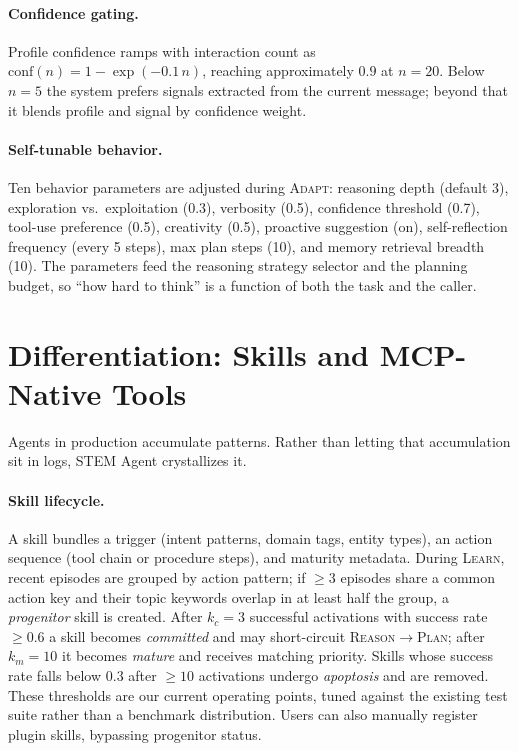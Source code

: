 \documentclass[11pt]{article}
\begin{document}
\paragraph{Confidence gating.} Profile confidence ramps with interaction count as
$\text{conf}(n) = 1 - \exp(-0.1\,n)$,
reaching approximately $0.9$ at $n{=}20$. Below $n{=}5$ the system prefers signals extracted from the current message; beyond that it blends profile and signal by confidence weight.

\paragraph{Self-tunable behavior.} Ten behavior parameters are adjusted during \textsc{Adapt}: reasoning depth (default 3), exploration vs.\ exploitation (0.3), verbosity (0.5), confidence threshold (0.7), tool-use preference (0.5), creativity (0.5), proactive suggestion (on), self-reflection frequency (every 5 steps), max plan steps (10), and memory retrieval breadth (10). The parameters feed the reasoning strategy selector and the planning budget, so ``how hard to think'' is a function of both the task and the caller.

\section{Differentiation: Skills and MCP-Native Tools}
\label{sec:skills}

Agents in production accumulate patterns. Rather than letting that accumulation sit in logs, STEM Agent crystallizes it.

\paragraph{Skill lifecycle.} A skill bundles a trigger (intent patterns, domain tags, entity types), an action sequence (tool chain or procedure steps), and maturity metadata. During \textsc{Learn}, recent episodes are grouped by action pattern; if $\geq 3$ episodes share a common action key and their topic keywords overlap in at least half the group, a \emph{progenitor} skill is created. After $k_c{=}3$ successful activations with success rate $\geq 0.6$ a skill becomes \emph{committed} and may short-circuit \textsc{Reason}$\to$\textsc{Plan}; after $k_m{=}10$ it becomes \emph{mature} and receives matching priority. Skills whose success rate falls below $0.3$ after $\geq 10$ activations undergo \emph{apoptosis} and are removed. These thresholds are our current operating points, tuned against the existing test suite rather than a benchmark distribution. Users can also manually register plugin skills, bypassing progenitor status.
\end{document}
